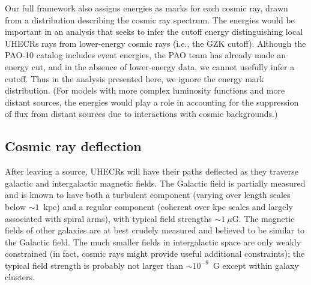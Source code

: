 Our full framework also assigns energies as marks for each cosmic ray, drawn
from a distribution describing the cosmic ray spectrum.  The energies would
be important in an analysis that seeks to infer the cutoff energy
distinguishing local UHECRs rays from lower-energy cosmic rays (i.e., the
GZK cutoff).  Although the PAO-10 catalog includes event energies, the PAO
team has already made an energy cut, and in the absence of lower-energy
data, we cannot usefully infer a cutoff.  Thus in the analysis presented
here, we ignore the energy mark distribution.  
(For models with more complex
luminosity functions and more distant sources, the energies would play a
role in accounting for the suppression of flux from distant sources due to
interactions with cosmic backgrounds.)

\subsection{Cosmic ray deflection}
\label{sec:dflxn}

After leaving a source, UHECRs will have their paths deflected as they
traverse galactic and intergalactic magnetic fields.  The Galactic field is
partially measured and is known to have both a turbulent component (varying
over length scales below $\sim 1$~kpc) and a regular component (coherent
over kpc scales and largely associated with spiral arms), with typical field
strengths $\sim 1~\mu$G.  The magnetic fields of other galaxies are at
best crudely measured and believed to be similar to the Galactic field. The
much smaller fields in intergalactic space are only weakly constrained (in
fact, cosmic rays might provide useful additional constraints); the typical
field strength is probably not larger than $\sim 10^{-9}$~G except within
galaxy clusters.

